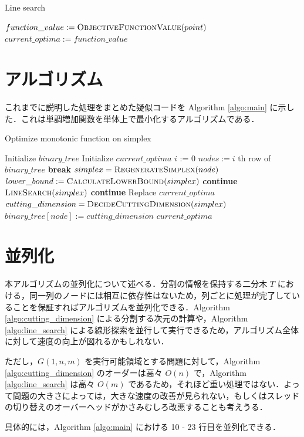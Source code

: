\documentclass[a4paper,11pt]{jreport}
\newcommand{\Continue}{\State \textbf{continue} }
\newcommand{\Break}{\State \textbf{break} }
\begin{document}
\begin{algorithm}
\caption{Line search}
\label{algo:line_search}
\begin{algorithmic}[1]
\State $ function\_value := \Call{ObjectiveFunctionValue}{point} $
\State $current\_optima := function\_value $
\EndIf
\EndFor
\EndFunction
\end{algorithmic}
\end{algorithm}

\section{アルゴリズム}

これまでに説明した処理をまとめた疑似コードを Algorithm \ref{algo:main} に示した．これは単調増加関数を単体上で最小化するアルゴリズムである．\par

\begin{algorithm}
\caption{Optimize monotonic function on simplex}
\label{algo:main}
\begin{algorithmic}[1]
\State Initialize $ binary\_tree $
\State Initialize $ current\_optima $
\State $ i $ := 0
\State $ nodes := i $ th row of $ binary\_tree $
\Break
\EndIf
{}
\State $ simplex = \Call{RegenerateSimplex}{node} $
\State $ lower\_bound := \Call{CalculateLowerBound}{simplex} $
\Continue
\EndIf
{}
\State $ \Call{LineSearch}{simplex} $
\Continue
\EndIf
{}
\State Replace $ current\_optima $
\EndIf
\State $ cutting\_dimension = \Call{DecideCuttingDimension}{simplex} $
\State $ binary\_tree[node] := cutting\_dimension $
\EndFor
\EndWhile
\State \Return $ current\_optima $
\end{algorithmic}
\end{algorithm}

\section{並列化}

本アルゴリズムの並列化について述べる．分割の情報を保持する二分木 $ T $ における，同一列のノードには相互に依存性はないため，列ごとに処理が完了していることを保証すればアルゴリズムを並列化できる．Algorithm \ref{algo:cutting_dimension} による分割する次元の計算や，Algorithm \ref{algo:line_search} による線形探索を並行して実行できるため，アルゴリズム全体に対して速度の向上が図れるかもしれない．\par
ただし，$ G(1, n, m) $ を実行可能領域とする問題に対して，Algorithm \ref{algo:cutting_dimension} のオーダーは高々 $ O(n) $ で，Algorithm \ref{algo:line_search} は高々 $ O(m) $ であるため，それほど重い処理ではない．よって問題の大きさによっては，大きな速度の改善が見られない，もしくはスレッドの切り替えのオーバーヘッドがかさみむしろ改悪することも考えうる．\par
具体的には，Algorithm \ref{algo:main} における 10 - 23 行目を並列化できる．
\end{document}
